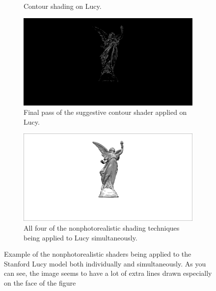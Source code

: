 \documentclass[10pt,twocolumn,letterpaper]{article}
\begin{document}
\begin{figure}
\begin{subfigure}{.48\linewidth}
        \caption{Contour shading on Lucy.}
        \label{fig:lucy-contours}
    \end{subfigure}
    \hfill
    \begin{subfigure}{.48\linewidth}
        \includegraphics[width=1\linewidth]{lucy/sugg_contours.png}
        \caption{Final pass of the suggestive contour shader applied on Lucy.}
        \label{fig:lucy-suggs}
    \end{subfigure}
    \hfill
    \begin{subfigure}{1\linewidth}
        \includegraphics[width=1\linewidth]{lucy/final.png}
        \caption{All four of the nonphotorealistic shading techniques being applied to Lucy simultaneously.}
        \label{fig:lucy-anime}
    \end{subfigure}
    \caption{Example of the nonphotorealistic shaders being applied to the Stanford Lucy model both individually and simultaneously. As you can see, the image seems to have a lot of extra lines drawn especially on the face of the figure}
    \label{fig:lucy}
\end{figure}
\end{document}
